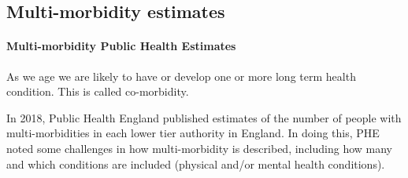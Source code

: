 \subsection{Multi-morbidity estimates}
\paragraph{Multi-morbidity Public Health Estimates} As we age we are likely to have or develop one or more long term health condition. This is called co-morbidity.

In 2018, Public Health England published estimates of the number of people with multi-morbidities in each lower tier authority in England. In doing this, PHE noted some challenges in how multi-morbidity is described, including how many and which conditions are included (physical and/or mental health conditions).

